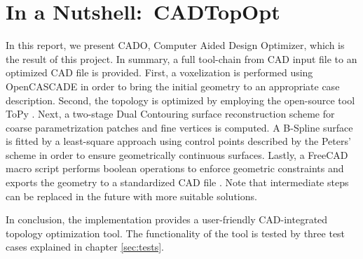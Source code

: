 \section{In a Nutshell:\ \acl{CADTopOpt}}
\label{sec:nutshell}
In this report, we present CADO, Computer Aided Design Optimizer, which is the result of this project. In summary, a full tool-chain from CAD input file to an optimized CAD file is provided. First, a voxelization is performed using OpenCASCADE in order to bring the initial geometry to an appropriate case description. Second, the topology is optimized by employing the open-source tool ToPy \cite{ToPy}.  
Next, a two-stage Dual Contouring surface reconstruction scheme for coarse parametrization patches and fine vertices is computed.
A B-Spline surface is fitted by a least-square approach using control points described by the Peters' scheme \cite{peters1992constructing} in order to ensure geometrically continuous surfaces. Lastly, a FreeCAD macro script performs boolean operations to enforce geometric constraints and exports the geometry to a standardized CAD file \cite{FreeCAD}.
Note that intermediate steps can be replaced in the future with more suitable solutions. 

In conclusion, the implementation provides a user-friendly CAD-integrated topology optimization tool. The functionality of the tool is tested by three test cases explained in chapter \ref{sec:tests}.

